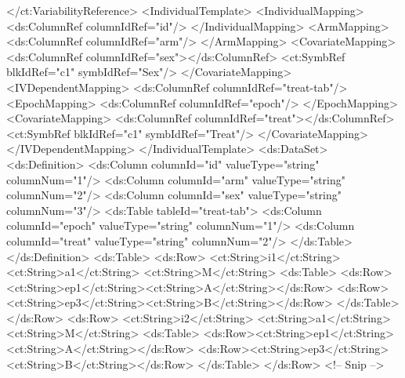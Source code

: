 \documentclass[a4paper,10pt]{article}
\begin{document}
\begin{xmlcode}
            </ct:VariabilityReference>
            <IndividualTemplate>
                <IndividualMapping>
                    <ds:ColumnRef columnIdRef="id"/>
                </IndividualMapping>
                <ArmMapping>
                    <ds:ColumnRef columnIdRef="arm"/>
                </ArmMapping>
                <CovariateMapping>
                    <ds:ColumnRef columnIdRef="sex"></ds:ColumnRef>
                    <ct:SymbRef blkIdRef="c1" symbIdRef="Sex"/>
                </CovariateMapping>
                <IVDependentMapping>
                    <ds:ColumnRef columnIdRef="treat-tab"/>
                    <EpochMapping>
                        <ds:ColumnRef columnIdRef="epoch"/>
                    </EpochMapping>
                    <CovariateMapping>
                        <ds:ColumnRef columnIdRef="treat"></ds:ColumnRef>
                        <ct:SymbRef blkIdRef="c1" symbIdRef="Treat"/>
                    </CovariateMapping>
                </IVDependentMapping>
            </IndividualTemplate>
            <ds:DataSet>
                <ds:Definition>
                    <ds:Column columnId="id" valueType="string" columnNum="1"/>
                    <ds:Column columnId="arm" valueType="string" columnNum="2"/>
                    <ds:Column columnId="sex" valueType="string" columnNum="3"/>
                    <ds:Table tableId="treat-tab">
                        <ds:Column columnId="epoch" valueType="string" columnNum="1"/>
                        <ds:Column columnId="treat" valueType="string" columnNum="2"/>
                    </ds:Table>
                </ds:Definition>
                <ds:Table>
                    <ds:Row>
                        <ct:String>i1</ct:String>
                        <ct:String>a1</ct:String>
                        <ct:String>M</ct:String>
                        <ds:Table>
                            <ds:Row><ct:String>ep1</ct:String><ct:String>A</ct:String></ds:Row>
                            <ds:Row><ct:String>ep3</ct:String><ct:String>B</ct:String></ds:Row>
                        </ds:Table>
                    </ds:Row>
                    <ds:Row>
                        <ct:String>i2</ct:String>
                        <ct:String>a1</ct:String>
                        <ct:String>M</ct:String>
                        <ds:Table>
                            <ds:Row><ct:String>ep1</ct:String><ct:String>A</ct:String></ds:Row>
                            <ds:Row><ct:String>ep3</ct:String><ct:String>B</ct:String></ds:Row>
                        </ds:Table>
                    </ds:Row>
                    <!-- Snip -->

\end{xmlcode}
\end{document}

